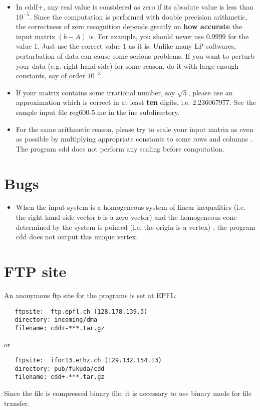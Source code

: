 \begin{itemize}

\item  In cddf+, any real value is considered as zero if its absolute value is
less than $10^{-5}$.  Since the computation is performed with double precision
arithmetic, the correctness of zero recognition depends greatly on {\bf how
accurate\/} the input matrix $(b- A)$ is.  For example, you should never use
$0.9999$ for the value $1$.  Just use the correct value $1$ as it is.
Unlike many LP softwares, perturbation of data
can cause some serious problems.  If you want to perturb your data (e.g. right
hand side) for some reason, do it with large enough constants, say of order
$10^{-3}$.


\item If your matrix contains some irrational number, say
$\sqrt{5}$, please use an approximation which is correct in at least {\bf ten\/} digits,
i.e.  $2.236067977$.   See the sample input file  reg600-5.ine in the ine subdirectory.
 
\item  For the same arithmetic reason, please try to scale your input matrix
as even as possible by multiplying appropriate constants to some rows and
columns .   The program cdd does not perform any scaling before
computation.

\end{itemize}

\section{Bugs}  \label{BUGS}
\begin{itemize}

\item When the input system is a homogeneous system of linear inequalities
(i.e. the right hand side vector $b$ is a zero vector) and the homogeneous
cone determined by the system is pointed (i.e. the origin is a vertex) , 
the program cdd does not output this unique vertex.

\end{itemize}

\section{FTP site}  \label{FTP}
An anonymous ftp site for the programs is set at EPFL:
\begin{verbatim}
   ftpsite:  ftp.epfl.ch (128.178.139.3)
   directory: incoming/dma
   filename: cdd+-***.tar.gz
\end{verbatim}
or
\begin{verbatim}
   ftpsite:  ifor13.ethz.ch (129.132.154.13)
   directory: pub/fukuda/cdd
   filename: cdd+-***.tar.gz
\end{verbatim}
Since the file is compressed binary file, it is necessary to use binary mode for
file transfer.


